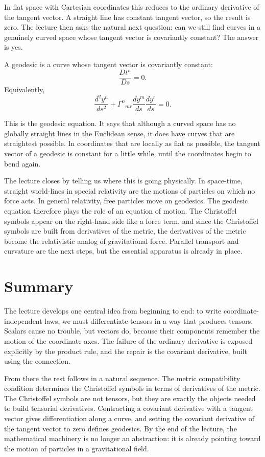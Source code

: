 In flat space with Cartesian coordinates this reduces to the ordinary derivative of the tangent vector. A straight line has constant tangent vector, so the result is zero. The lecture then asks the natural next question: can we still find curves in a genuinely curved space whose tangent vector is covariantly constant? The answer is yes.

\begin{definition}
A geodesic is a curve whose tangent vector is covariantly constant:
\begin{equation}
\frac{D t^n}{Ds}=0.
\end{equation}
Equivalently,
\begin{equation}
\frac{d^2 y^n}{ds^2}
+
\Gamma^n{}_{mr}\frac{dy^m}{ds}\frac{dy^r}{ds}
=
0.
\end{equation}
\end{definition}

This is the geodesic equation. It says that although a curved space has no globally straight lines in the Euclidean sense, it does have curves that are straightest possible. In coordinates that are locally as flat as possible, the tangent vector of a geodesic is constant for a little while, until the coordinates begin to bend again.

The lecture closes by telling us where this is going physically. In space-time, straight world-lines in special relativity are the motions of particles on which no force acts. In general relativity, free particles move on geodesics. The geodesic equation therefore plays the role of an equation of motion. The Christoffel symbols appear on the right-hand side like a force term, and since the Christoffel symbols are built from derivatives of the metric, the derivatives of the metric become the relativistic analog of gravitational force. Parallel transport and curvature are the next steps, but the essential apparatus is already in place.

\section{Summary}

The lecture develops one central idea from beginning to end: to write coordinate-independent laws, we must differentiate tensors in a way that produces tensors. Scalars cause no trouble, but vectors do, because their components remember the motion of the coordinate axes. The failure of the ordinary derivative is exposed explicitly by the product rule, and the repair is the covariant derivative, built using the connection.

From there the rest follows in a natural sequence. The metric compatibility condition determines the Christoffel symbols in terms of derivatives of the metric. The Christoffel symbols are not tensors, but they are exactly the objects needed to build tensorial derivatives. Contracting a covariant derivative with a tangent vector gives differentiation along a curve, and setting the covariant derivative of the tangent vector to zero defines geodesics. By the end of the lecture, the mathematical machinery is no longer an abstraction: it is already pointing toward the motion of particles in a gravitational field.